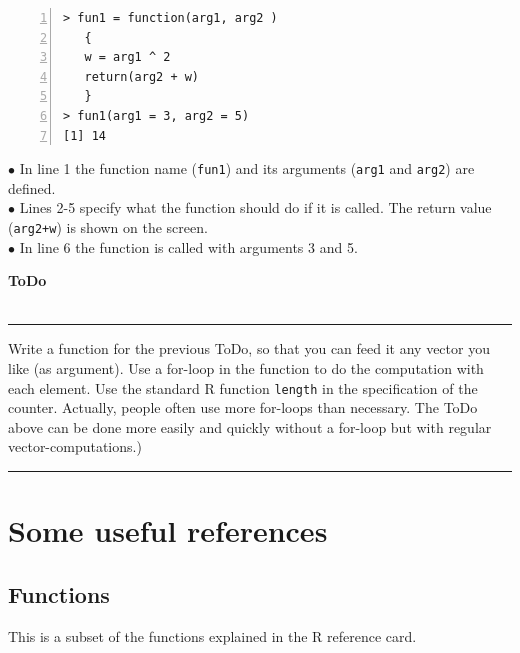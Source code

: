 \documentclass[a4paper,11pt,twocolumn,tablecaptionabove]{scrartcl} %
\makeatletter
\newenvironment{ToDo} {%
  \begin{flushright}
    \hfill
    \begin{minipage}{0.95\columnwidth}         %
    \textsf{\textbf{ToDo}} \\
      \vspace{-0.85cm}\\
      {\color{Gray}\rule[-0.1cm]{\columnwidth}{1.5pt}}} { %
      {\color{Gray} \rule[0.3cm]{\columnwidth}{1.5pt}}
    \end{minipage}
    \vspace{1em}
  \end{flushright}
  }
\let\SF@@footnote\footnote
\def\footnote{\ifx\protect\@typeset@protect
 \expandafter\SF@@footnote
 \else
 \expandafter\SF@gobble@opt
 \fi
}
\edef\SF@gobble@opt{\noexpand\protect
 \expandafter\noexpand\csname SF@gobble@opt \endcsname}
\makeatother
\begin{document}
\begin{Verbatim}[frame=single,numbers=left,gobble=0, xleftmargin=0.35cm, numbersep=0.1cm]
> fun1 = function(arg1, arg2 )
   {
   w = arg1 ^ 2
   return(arg2 + w)
   }
> fun1(arg1 = 3, arg2 = 5) 
[1] 14

\end{Verbatim}

\noindent $\bullet$ In line 1 the function name (\texttt{fun1}) and its arguments (\texttt{arg1} and \texttt{arg2}) are defined. \\
\noindent $\bullet$ Lines 2-5 specify what the function should do if it is called. The return value (\texttt{arg2+w}) is shown on the screen. \\
\noindent $\bullet$ In line 6 the function is called with arguments 3 and 5.

\begin{ToDo}
Write a function for the previous ToDo, so that you can feed it any vector you like (as argument). Use a for-loop in the function to do the computation with each element. Use the standard R function \texttt{length} in the specification of the counter. \footnote{Actually, people often use more for-loops than necessary. The ToDo above can be done more easily and quickly without a for-loop but with regular vector-computations.})
\end{ToDo}

\newpage


\section{Some useful references}

\subsection{Functions}

This is a subset of the functions explained in the R reference card.\\
\end{document}
